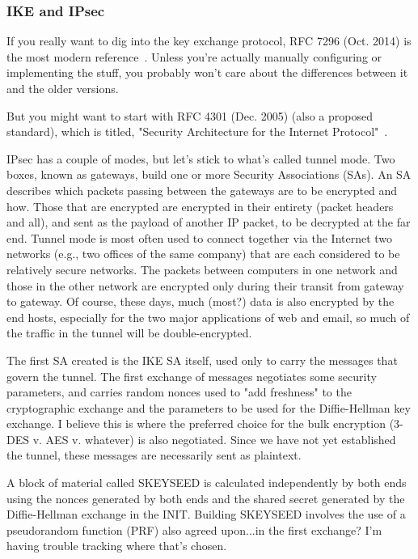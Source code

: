 \documentclass[%
 aip,
 jmp,%
 amsmath,amssymb,
 reprint,%
]{revtex4-1}
\begin{document}
\subsubsection{IKE and IPsec}

If you really want to dig into the key exchange protocol, RFC 7296
(Oct. 2014) is the most modern reference~\cite{RFC7296}.  Unless
you're actually manually configuring or implementing the stuff, you
probably won't care about the differences between it and the older
versions.

But you might want to start with RFC 4301 (Dec. 2005) (also a proposed
standard), which is titled, "Security Architecture for the Internet
Protocol"~\cite{RFC4301}.

IPsec has a couple of modes, but let's stick to what's called tunnel
mode.  Two boxes, known as gateways, build one or more Security
Associations (SAs). An SA describes which packets passing between the
gateways are to be encrypted and how.  Those that are encrypted are
encrypted in their entirety (packet headers and all), and sent as the
payload of another IP packet, to be decrypted at the far end.  Tunnel
mode is most often used to connect together via the Internet two
networks (e.g., two offices of the same company) that are each
considered to be relatively secure networks.  The packets between
computers in one network and those in the other network are encrypted
only during their transit from gateway to gateway.  Of course, these
days, much (most?) data is also encrypted by the end hosts, especially
for the two major applications of web and email, so much of the
traffic in the tunnel will be double-encrypted.

The first SA created is the IKE SA itself, used only to carry the
messages that govern the tunnel.  The first exchange of messages
negotiates some security parameters, and carries random nonces used to
"add freshness" to the cryptographic exchange and the parameters to be
used for the Diffie-Hellman key exchange.  I believe this is where the
preferred choice for the bulk encryption (3-DES v. AES v. whatever) is
also negotiated.  Since we have not yet established the tunnel, these
messages are necessarily sent as plaintext.

A block of material called SKEYSEED is calculated independently by
both ends using the nonces generated by both ends and the
shared secret generated by the Diffie-Hellman exchange in the INIT.
Building SKEYSEED involves the use of a pseudorandom function (PRF)
also agreed upon...in the first exchange?  I'm having trouble tracking
where that's chosen.
\end{document}
